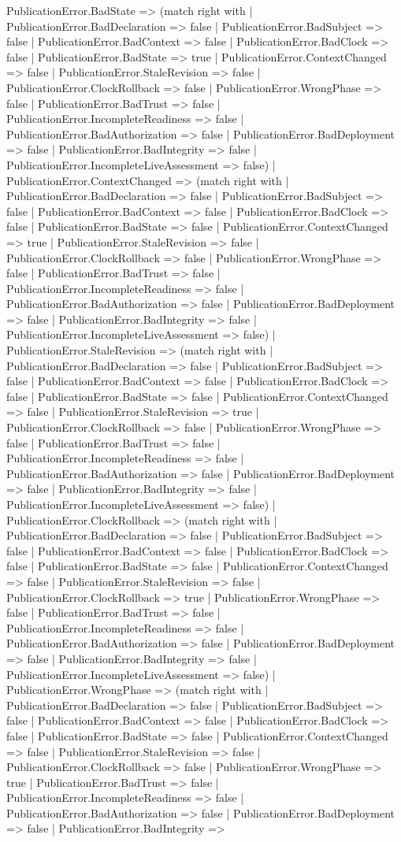 \documentclass[11pt]{article}
\begin{document}
PublicationError.BadState => (match right with | PublicationError.BadDeclaration => false | PublicationError.BadSubject => false | PublicationError.BadContext => false | PublicationError.BadClock => false | PublicationError.BadState => true | PublicationError.ContextChanged => false | PublicationError.StaleRevision => false | PublicationError.ClockRollback => false | PublicationError.WrongPhase => false | PublicationError.BadTrust => false | PublicationError.IncompleteReadiness => false | PublicationError.BadAuthorization => false | PublicationError.BadDeployment => false | PublicationError.BadIntegrity => false | PublicationError.IncompleteLiveAssessment => false) | PublicationError.ContextChanged => (match right with | PublicationError.BadDeclaration => false | PublicationError.BadSubject => false | PublicationError.BadContext => false | PublicationError.BadClock => false | PublicationError.BadState => false | PublicationError.ContextChanged => true | PublicationError.StaleRevision => false | PublicationError.ClockRollback => false | PublicationError.WrongPhase => false | PublicationError.BadTrust => false | PublicationError.IncompleteReadiness => false | PublicationError.BadAuthorization => false | PublicationError.BadDeployment => false | PublicationError.BadIntegrity => false | PublicationError.IncompleteLiveAssessment => false) | PublicationError.StaleRevision => (match right with | PublicationError.BadDeclaration => false | PublicationError.BadSubject => false | PublicationError.BadContext => false | PublicationError.BadClock => false | PublicationError.BadState => false | PublicationError.ContextChanged => false | PublicationError.StaleRevision => true | PublicationError.ClockRollback => false | PublicationError.WrongPhase => false | PublicationError.BadTrust => false | PublicationError.IncompleteReadiness => false | PublicationError.BadAuthorization => false | PublicationError.BadDeployment => false | PublicationError.BadIntegrity => false | PublicationError.IncompleteLiveAssessment => false) | PublicationError.ClockRollback => (match right with | PublicationError.BadDeclaration => false | PublicationError.BadSubject => false | PublicationError.BadContext => false | PublicationError.BadClock => false | PublicationError.BadState => false | PublicationError.ContextChanged => false | PublicationError.StaleRevision => false | PublicationError.ClockRollback => true | PublicationError.WrongPhase => false | PublicationError.BadTrust => false | PublicationError.IncompleteReadiness => false | PublicationError.BadAuthorization => false | PublicationError.BadDeployment => false | PublicationError.BadIntegrity => false | PublicationError.IncompleteLiveAssessment => false) | PublicationError.WrongPhase => (match right with | PublicationError.BadDeclaration => false | PublicationError.BadSubject => false | PublicationError.BadContext => false | PublicationError.BadClock => false | PublicationError.BadState => false | PublicationError.ContextChanged => false | PublicationError.StaleRevision => false | PublicationError.ClockRollback => false | PublicationError.WrongPhase => true | PublicationError.BadTrust => false | PublicationError.IncompleteReadiness => false | PublicationError.BadAuthorization => false | PublicationError.BadDeployment => false | PublicationError.BadIntegrity => 
\end{document}

